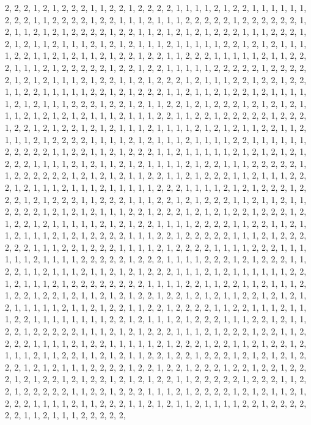\documentclass[
]{article}
\begin{document}
\begin{Schunk}
\begin{Soutput}
2, 2, 2, 1, 2, 1, 2, 2, 2, 1, 1, 2, 2, 1, 2, 2, 2, 2, 1, 1, 1, 1, 2, 1, 2, 2, 1, 1, 1, 1, 1, 1, 2, 2, 2, 1, 1, 2, 2, 2, 2, 1, 2, 2, 1, 1, 1, 2, 1, 1, 1, 2, 2, 2, 2, 2, 1, 2, 2, 2, 2, 2, 2, 1, 2, 1, 1, 2, 1, 2, 1, 2, 2, 2, 2, 1, 2, 2, 1, 1, 2, 1, 2, 1, 2, 1, 2, 2, 2, 1, 1, 1, 2, 2, 2, 1, 2, 1, 2, 1, 1, 2, 1, 1, 1, 2, 1, 2, 1, 2, 1, 1, 1, 2, 1, 1, 1, 1, 1, 2, 2, 1, 2, 1, 2, 1, 1, 1, 1, 2, 2, 1, 1, 2, 1, 2, 1, 1, 2, 1, 2, 2, 1, 2, 2, 1, 1, 2, 2, 2, 1, 1, 1, 1, 1, 2, 1, 1, 2, 2, 2, 1, 1, 1, 2, 1, 2, 2, 2, 2, 2, 1, 2, 2, 1, 2, 2, 1, 1, 1, 1, 1, 2, 2, 2, 2, 2, 1, 2, 2, 2, 2, 2, 1, 2, 1, 2, 1, 1, 1, 2, 1, 2, 2, 1, 1, 2, 1, 2, 2, 2, 1, 2, 1, 1, 1, 2, 2, 1, 2, 2, 1, 2, 2, 1, 1, 2, 2, 1, 1, 1, 1, 1, 2, 2, 1, 2, 1, 2, 2, 2, 1, 1, 2, 1, 1, 2, 1, 2, 2, 1, 2, 1, 1, 1, 1, 1, 2, 1, 2, 1, 1, 1, 2, 2, 2, 1, 2, 2, 1, 2, 1, 1, 2, 2, 1, 2, 1, 2, 2, 2, 1, 2, 1, 2, 1, 2, 1, 1, 1, 2, 1, 2, 1, 2, 1, 2, 1, 1, 1, 2, 1, 1, 1, 2, 2, 1, 1, 2, 2, 1, 2, 2, 2, 2, 2, 1, 2, 2, 2, 1, 2, 2, 1, 2, 1, 2, 2, 1, 2, 1, 2, 1, 1, 1, 2, 1, 1, 1, 1, 2, 1, 2, 1, 2, 1, 1, 2, 2, 1, 1, 2, 1, 1, 1, 2, 1, 2, 2, 2, 2, 1, 1, 1, 1, 2, 1, 2, 1, 1, 1, 2, 1, 1, 1, 1, 2, 2, 1, 1, 1, 1, 1, 1, 2, 2, 2, 2, 2, 1, 1, 2, 2, 1, 1, 2, 1, 2, 2, 2, 1, 1, 2, 1, 1, 1, 1, 1, 2, 1, 2, 1, 2, 1, 2, 1, 2, 2, 2, 1, 1, 1, 1, 2, 1, 2, 1, 1, 2, 1, 2, 1, 1, 1, 1, 2, 1, 2, 2, 1, 1, 1, 2, 2, 2, 2, 2, 1, 1, 2, 2, 2, 2, 2, 2, 1, 2, 1, 2, 1, 2, 1, 1, 2, 2, 1, 1, 2, 1, 2, 2, 2, 1, 1, 2, 1, 1, 1, 2, 2, 2, 1, 2, 1, 1, 1, 2, 1, 1, 1, 2, 1, 1, 1, 1, 1, 2, 2, 2, 1, 1, 1, 1, 2, 1, 2, 1, 2, 2, 2, 1, 2, 2, 2, 1, 2, 1, 2, 2, 2, 1, 1, 2, 2, 2, 1, 1, 1, 2, 2, 1, 2, 1, 2, 2, 2, 1, 1, 2, 1, 1, 2, 1, 1, 2, 2, 2, 2, 1, 2, 1, 2, 1, 2, 1, 1, 1, 2, 2, 1, 2, 2, 2, 1, 2, 1, 2, 1, 2, 2, 1, 2, 2, 2, 1, 2, 1, 2, 2, 1, 2, 1, 1, 1, 1, 1, 2, 1, 2, 1, 2, 2, 1, 1, 1, 1, 2, 2, 2, 2, 1, 1, 2, 2, 1, 1, 2, 1, 1, 2, 1, 1, 1, 2, 1, 2, 1, 2, 2, 2, 2, 1, 1, 1, 2, 2, 1, 2, 2, 2, 2, 2, 1, 1, 1, 2, 1, 2, 2, 2, 2, 2, 2, 1, 1, 1, 2, 2, 1, 2, 2, 2, 1, 1, 1, 1, 2, 1, 2, 2, 2, 2, 1, 1, 1, 1, 2, 2, 2, 1, 1, 1, 1, 1, 1, 2, 1, 1, 1, 1, 2, 2, 2, 2, 2, 1, 2, 2, 2, 1, 1, 1, 1, 2, 2, 2, 1, 2, 1, 2, 2, 2, 1, 1, 2, 2, 1, 1, 2, 1, 1, 1, 2, 1, 1, 2, 1, 2, 1, 2, 2, 2, 1, 1, 1, 2, 1, 2, 1, 1, 1, 1, 1, 1, 2, 2, 1, 2, 1, 1, 1, 2, 1, 2, 2, 2, 2, 2, 2, 2, 2, 1, 1, 1, 1, 2, 2, 1, 1, 2, 2, 1, 1, 2, 1, 1, 1, 2, 1, 2, 2, 1, 2, 2, 1, 2, 1, 1, 2, 1, 2, 1, 2, 2, 1, 2, 2, 1, 2, 1, 2, 1, 1, 2, 2, 1, 2, 1, 2, 1, 2, 1, 1, 1, 1, 1, 2, 1, 1, 2, 1, 2, 2, 1, 1, 2, 2, 1, 2, 2, 2, 2, 1, 1, 2, 2, 1, 1, 1, 2, 1, 1, 1, 2, 2, 1, 1, 1, 1, 1, 1, 1, 1, 2, 2, 1, 2, 1, 1, 1, 2, 1, 2, 2, 2, 1, 1, 1, 2, 2, 1, 2, 1, 1, 2, 2, 1, 2, 2, 2, 2, 2, 1, 1, 1, 2, 1, 2, 1, 2, 2, 2, 1, 1, 1, 2, 1, 2, 2, 2, 1, 2, 2, 1, 1, 2, 2, 2, 2, 1, 1, 1, 1, 2, 1, 2, 2, 1, 1, 1, 1, 1, 2, 1, 2, 2, 2, 1, 2, 2, 1, 1, 2, 1, 2, 2, 1, 2, 1, 1, 1, 2, 1, 1, 2, 2, 1, 1, 2, 1, 2, 1, 1, 2, 2, 1, 2, 2, 1, 2, 2, 2, 1, 2, 1, 2, 1, 2, 1, 2, 2, 2, 1, 2, 1, 2, 1, 1, 1, 2, 2, 2, 2, 1, 2, 2, 1, 2, 2, 1, 2, 2, 2, 1, 2, 2, 1, 2, 2, 1, 2, 2, 2, 1, 2, 1, 2, 2, 1, 2, 1, 2, 2, 1, 2, 1, 2, 1, 2, 2, 1, 1, 2, 2, 2, 2, 2, 1, 2, 2, 2, 1, 1, 2, 2, 1, 2, 2, 2, 2, 2, 1, 1, 2, 2, 1, 2, 2, 2, 1, 1, 1, 2, 1, 2, 2, 2, 2, 1, 2, 1, 2, 1, 1, 2, 1, 2, 2, 2, 1, 1, 1, 1, 2, 1, 1, 2, 2, 2, 1, 1, 2, 1, 2, 1, 1, 2, 1, 1, 1, 1, 2, 2, 1, 2, 2, 2, 2, 2, 2, 1, 1, 2, 1, 1, 1, 2, 2, 2, 2, 2, 
\end{Soutput}
\end{Schunk}
\end{document}
